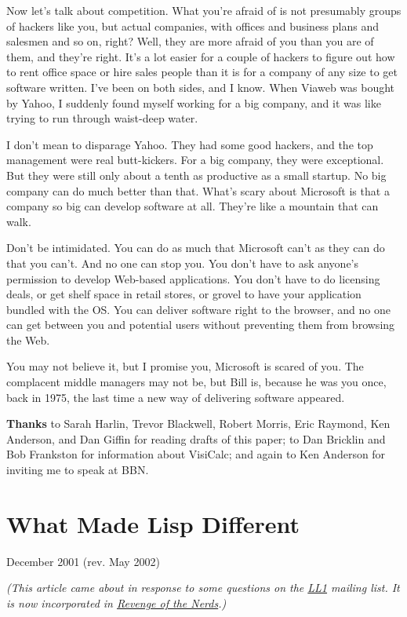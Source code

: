 \documentclass[12pt]{book}
\begin{document}
Now let's talk about competition. What you're afraid of is not
presumably groups of hackers like you, but actual companies, with
offices and business plans and salesmen and so on, right? Well, they are
more afraid of you than you are of them, and they're right. It's a lot
easier for a couple of hackers to figure out how to rent office space or
hire sales people than it is for a company of any size to get software
written. I've been on both sides, and I know. When Viaweb was bought by
Yahoo, I suddenly found myself working for a big company, and it was
like trying to run through waist-deep water.

I don't mean to disparage Yahoo. They had some good hackers, and the top
management were real butt-kickers. For a big company, they were
exceptional. But they were still only about a tenth as productive as a
small startup. No big company can do much better than that. What's scary
about Microsoft is that a company so big can develop software at all.
They're like a mountain that can walk.

Don't be intimidated. You can do as much that Microsoft can't as they
can do that you can't. And no one can stop you. You don't have to ask
anyone's permission to develop Web-based applications. You don't have to
do licensing deals, or get shelf space in retail stores, or grovel to
have your application bundled with the OS. You can deliver software
right to the browser, and no one can get between you and potential users
without preventing them from browsing the Web.

You may not believe it, but I promise you, Microsoft is scared of you.
The complacent middle managers may not be, but Bill is, because he was
you once, back in 1975, the last time a new way of delivering software
appeared.


\textbf{Thanks} to Sarah Harlin, Trevor Blackwell, Robert Morris, Eric
Raymond, Ken Anderson, and Dan Giffin for reading drafts of this paper;
to Dan Bricklin and Bob Frankston for information about VisiCalc; and
again to Ken Anderson for inviting me to speak at BBN.
\chapter{What Made Lisp Different}

December 2001 (rev. May 2002)

\emph{(This article came about in response to some questions on the
\href{http://ll1.mit.edu}{LL1} mailing list. It is now incorporated in
\href{icad.html}{Revenge of the Nerds}.)}
\end{document}
